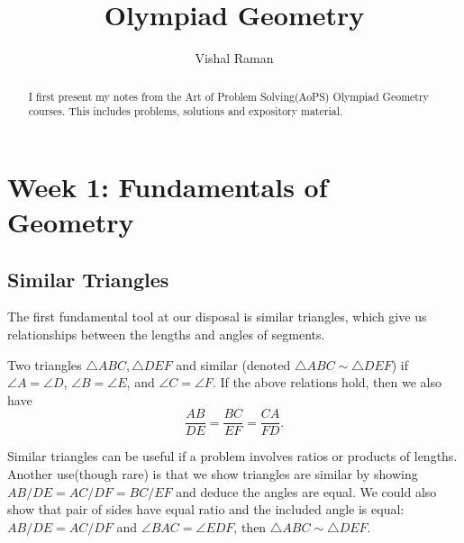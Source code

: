\documentclass[12pt]{scrartcl}
\newcommand{\<}{\langle}
\renewcommand{\>}{\rangle}
\begin{document}
\title{Olympiad Geometry}
\author{Vishal Raman}
\maketitle
\begin{abstract}
I first present my notes from the Art of Problem Solving(AoPS) Olympiad Geometry courses.  This includes problems, solutions and expository material.
\end{abstract}
\tableofcontents
\pagebreak
\section{Week 1: Fundamentals of Geometry}
\subsection{Similar Triangles}
The first fundamental tool at our disposal is similar triangles, which give us relationships between the lengths and angles of segments.  \begin{definition} Two triangles $\triangle ABC, \triangle DEF$ and similar (denoted $\triangle ABC \sim \triangle DEF$) if $\angle A = \angle D$, $\angle B = \angle E$, and $\angle C = \angle F$.  If the above relations hold, then we also have
$$\frac{AB}{DE} = \frac{BC}{EF} = \frac{CA}{FD}.$$
\end{definition}

Similar triangles can be useful if a problem involves ratios or products of lengths.  Another use(though rare) is that we show triangles are similar by showing $AB/DE = AC/DF = BC/EF$ and deduce the angles are equal.  We could also show that pair of sides have equal ratio and the included angle is equal: $AB/DE = AC/DF$ and $\angle BAC = \angle EDF$, then $\triangle ABC \sim \triangle DEF$.
\end{document}
